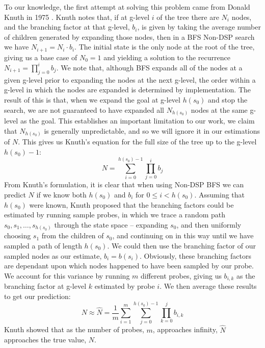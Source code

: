 \documentclass{article}
\begin{document}
To our knowledge, the first attempt at solving this problem came from Donald Knuth in 1975 \cite{knuth1975estimating}.
Knuth notes that, if at g-level \(i\) of the tree there are \(N_i\) nodes,
and the branching factor at that g-level, \(b_i\), is
given by taking the average number of children generated by expanding those nodes,
then in a BFS Non-DSP search we have \(N_{i+1} = N_i \cdot b_i\).
The initial state is the only node at the root of the tree,
giving us a base case of \(N_0 = 1\) and yielding a solution to the recurrence \(N_{i+1} = \prod^{i}_{j=0} b_j\).
We note that, although BFS expands all of the nodes at a given g-level prior to expanding
the nodes at the next g-level, the order within a g-level in which the nodes are expanded is determined by implementation.
The result of this is that, when we expand the goal at g-level \(h(s_0)\) and stop the search,
we are not guaranteed to have expanded all \(N_{h(s_0)}\) nodes at the same g-level as the goal.
This establishes an important limitation to our work, we claim that \(N_{h(s_0)}\) is generally unpredictable,
and so we will ignore it in our estimations of \(N\).
This gives us Knuth's equation for the full size of the tree up to the g-level \(h(s_0) - 1\):
\[N = \sum^{h(s_0) - 1}_{i = 0} \prod^{i}_{j = 0} b_j \]
From Knuth's formulation, it is clear that when using Non-DSP BFS we can predict \(N\)
if we know both \(h(s_0)\) and \(b_i\) for \(0 \leq i < h(s_0)\).
Assuming that \(h(s_0)\) were known,
Knuth proposed that the branching factors could be estimated by running sample probes,
in which we trace a random path \(s_0, s_1, \ldots, s_{h(s_0)}\) through the state space --
expanding \(s_0\), and then uniformly choosing \(s_1\) from the children of \(s_0\), and continuing on in this way until
we have sampled a path of length \(h(s_0)\).
We could then use the branching factor of our sampled nodes as our estimate, \(b_i = b(s_i)\).
Obviously, these branching factors are dependant upon which nodes happened to have been sampled by our probe.
We account for this variance by running \(m\) different probes,
giving us \(b_{i,k}\) as the branching factor at g-level \(k\) estimated by probe \(i\).
We then average these results to get our prediction:
\[N \approx \hat{N} = \frac{1}{m} \sum^{m}_{i = 1} \sum^{h(s_0) - 1}_{j = 0} \prod^{j}_{k = 0} b_{i,k} \]
Knuth showed that as the number of probes, \(m\), approaches infinity, \(\hat{N}\) approaches the true value, \(N\). \\
\end{document}
